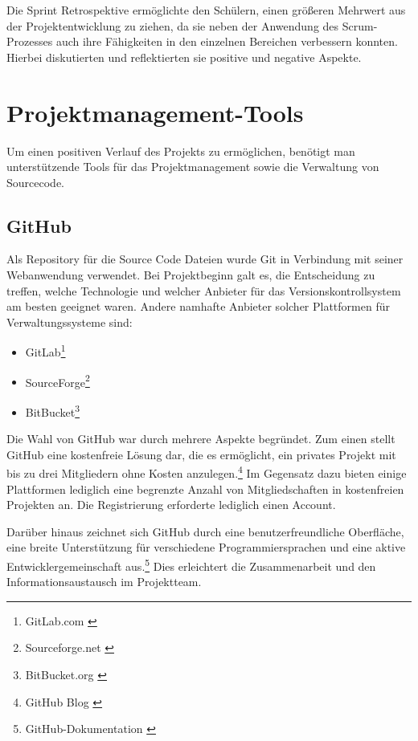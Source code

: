 Die Sprint Retrospektive ermöglichte den Schülern, einen größeren Mehrwert aus der Projektentwicklung zu ziehen, da sie
neben der Anwendung des Scrum-Prozesses auch ihre Fähigkeiten in den einzelnen Bereichen verbessern konnten. Hierbei
diskutierten und reflektierten sie positive und negative Aspekte.

\section{Projektmanagement-Tools}
Um einen positiven Verlauf des Projekts zu ermöglichen, benötigt man unterstützende
Tools für das Projektmanagement sowie die Verwaltung von Sourcecode.

\subsection{GitHub}
Als Repository für die Source Code Dateien wurde Git in Verbindung mit seiner Webanwendung verwendet. Bei Projektbeginn
galt es, die Entscheidung zu treffen, welche Technologie und welcher Anbieter für das Versionskontrollsystem am besten
geeignet waren.
Andere namhafte Anbieter solcher Plattformen für Verwaltungssysteme sind:
\begin{itemize}
    \item GitLab\footnote{GitLab.com \cite{GitLab Website}}
    \item SourceForge\footnote{Sourceforge.net \cite{SourceForge Website}}
    \item BitBucket\footnote{BitBucket.org \cite{BitBucket Website}}
\end{itemize}

Die Wahl von GitHub war durch mehrere Aspekte begründet. Zum einen stellt GitHub eine kostenfreie Lösung dar, die es
ermöglicht, ein privates Projekt mit bis zu drei Mitgliedern ohne Kosten anzulegen.\footnote{GitHub Blog \cite{Repositories und Mitglieder}} Im Gegensatz dazu bieten einige Plattformen
lediglich eine begrenzte Anzahl von Mitgliedschaften in kostenfreien Projekten an. Die Registrierung erforderte lediglich
einen Account.

Darüber hinaus zeichnet sich GitHub durch eine benutzerfreundliche Oberfläche, eine breite Unterstützung für verschiedene
Programmiersprachen und eine aktive Entwicklergemeinschaft aus.\footnote{GitHub-Dokumentation \cite{GitHub Sprachunterstuetzung}} Dies erleichtert die Zusammenarbeit und den Informationsaustausch
im Projektteam.

\newpage

